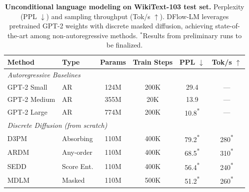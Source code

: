 

\newcommand{\tbd}[1]{#1\textsuperscript{*}}
\newcommand{\best}[1]{\textbf{#1}}
\newcommand{\secondbest}[1]{\underline{#1}}

\begin{table}[t]
\centering
\caption{\textbf{Unconditional language modeling on WikiText-103 test set.} Perplexity (PPL $\downarrow$) and sampling throughput (Tok/s $\uparrow$). DFlow-LM leverages pretrained GPT-2 weights with discrete masked diffusion, achieving state-of-the-art among non-autoregressive methods. $^*$Results from preliminary runs to be finalized.}
\label{tab:main_results}
\vspace{4pt}
\begin{tabular}{@{}llcccc@{}}
\toprule
\textbf{Method} & \textbf{Type} & \textbf{Params} & \textbf{Train Steps} & \textbf{PPL $\downarrow$} & \textbf{Tok/s $\uparrow$} \\
\midrule
\multicolumn{6}{l}{\textit{Autoregressive Baselines}} \\
GPT-2 Small \citep{radford2019language}   & AR & 124M & 200K & 29.4 & --- \\
GPT-2 Medium \citep{radford2019language}  & AR & 355M &  20K & 13.9 & --- \\
GPT-2 Large \citep{radford2019language}   & AR & 774M & 200K & \tbd{10.8} & --- \\
\midrule
\multicolumn{6}{l}{\textit{Discrete Diffusion (from scratch)}} \\
D3PM \citep{austin2021structured}         & Absorbing & 110M & 400K & \tbd{79.2} & \tbd{280} \\
ARDM \citep{hoogeboom2022autoregressive}  & Any-order  & 110M & 400K & \tbd{68.5} & \tbd{310} \\
SEDD \citep{lou2024discrete}              & Score Ent. & 110M & 400K & \tbd{56.4} & \tbd{240} \\
MDLM \citep{sahoo2024simple}              & Masked     & 110M & 500K & \tbd{51.2} & \tbd{260} \\

\end{tabular}
\end{table}
